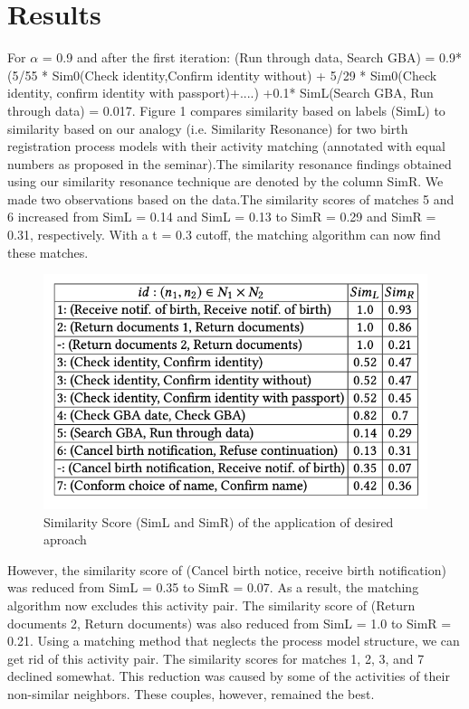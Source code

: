 \documentclass[runningheads]{llncs}
\begin{document}
\section{Results}
\noindent For $\alpha$ = 0.9 and after the first iteration: (Run through data, Search GBA) = 0.9*(5/55 * Sim0(Check identity,Confirm identity without) + 5/29 *  Sim0(Check identity, confirm identity with passport)+....) +0.1* SimL(Search GBA, Run through data) = 0.017. Figure 1 compares similarity based on labels (SimL) to similarity based on our analogy (i.e. Similarity Resonance) for two birth registration process models with their activity matching (annotated with equal numbers as proposed in the seminar).The similarity resonance findings obtained using our similarity resonance technique are denoted by the column SimR. We made two observations based on the data.The similarity scores of matches 5 and 6 increased from SimL = 0.14 and SimL = 0.13 to SimR = 0.29 and SimR = 0.31, respectively. With a t = 0.3 cutoff, the matching algorithm can now find these matches.\cite{ref14}
\begin{figure}
    \centering
    \includegraphics[width = \textwidth]{Figures/Fig_8.PNG}
    \caption{Similarity Score (SimL and SimR) of the application of desired aproach \cite{ref22}}
    \label{fig:8}
\end{figure}

However, the similarity score of (Cancel birth notice, receive birth notification) was reduced from SimL = 0.35 to SimR = 0.07. As a result, the matching algorithm now excludes this activity pair. The similarity score of (Return documents 2, Return documents) was also reduced from SimL = 1.0 to SimR = 0.21. Using a matching method that neglects the process model structure, we can get rid of this activity pair. The similarity scores for matches 1, 2, 3, and 7 declined somewhat. This reduction was caused by some of the activities of their non-similar neighbors. These couples, however, remained the best.\newline
\end{document}
